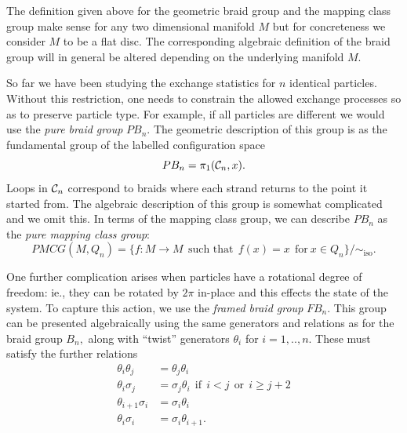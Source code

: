\documentclass[aps, prl, letterpaper, twocolumn, superscriptaddress, notitlepage, 10pt]{revtex4-1}
\begin{document}

The definition given above for the geometric braid group
and the mapping class group make sense for any two dimensional
manifold $M$ but for concreteness we consider $M$ to be
a flat disc. 
The corresponding algebraic definition of the braid group
will in general be altered depending on the underlying manifold
$M.$

So far we have been studying the exchange statistics
for $n$ identical particles. Without this restriction, one needs to
constrain the allowed exchange processes so as to preserve particle type.
For example, if all particles are different we would use the
\emph{pure braid group} $PB_n.$
The geometric description of
this group is as the fundamental group of the labelled
configuration space
$$
    PB_n = \pi_1 ( \mathcal{C}_n, x ).
$$
Loops in $\mathcal{C}_n$ correspond to braids where each strand returns
to the point it started from.
The algebraic description of this group is somewhat complicated and
we omit this.
In terms of the mapping class group, we can describe $PB_n$
as the \emph{pure mapping class group}:
$$
    PMCG(M, Q_n) = \{ f : M \to M \ \ \mbox{such that}\ \ f(x)=x \ \ \mbox{for}\ x\in Q_n\} / \sim_{\mbox{iso}}.
$$

One further complication arises when particles have a rotational
degree of freedom: ie., they can be rotated by $2\pi$ in-place and
this effects the state of the system.
To capture this action, we use the \emph{framed braid group} $FB_n.$
This group can be presented algebraically using the same generators
and relations as for the braid group $B_n,$ along with
``twist'' generators $\theta_i$ for $i=1,..,n.$
These must satisfy the further relations
\begin{align*}
    \theta_i \theta_j &= \theta_j \theta_i \\
    \theta_i\sigma_j &= \sigma_j\theta_i 
    \ \ \mbox{if}\ \ i<j \ \ \mbox{or}\ \ i\ge j+2\\
    \theta_{i+1}\sigma_i &= \sigma_i\theta_i \\
    \theta_{i}\sigma_i &= \sigma_i\theta_{i+1}.
\end{align*}
\end{document}
